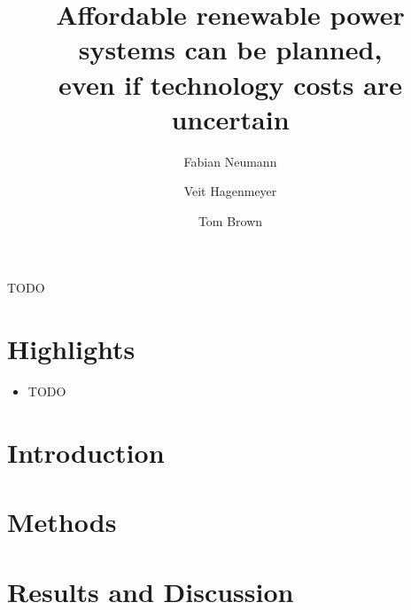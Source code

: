 \documentclass[1p,11pt]{elsarticle}
\begin{document}
\begin{frontmatter}

	\title{Affordable renewable power systems can be planned,\\
	       even if technology costs are uncertain}
	
	\author[kitaddress]{Fabian Neumann}
	\author[kitaddress]{Veit Hagenmeyer}
	\author[kitaddress]{Tom Brown}
	\address[kitaddress]{Institute for Automation and Applied Informatics (IAI), Karlsruhe Institute of Technology (KIT), Hermann-von-Helmholtz-Platz 1, 76344, Eggenstein-Leopoldshafen, Germany}

	\begin{abstract}
		
	\end{abstract}

	\begin{keyword}
		TODO
	\end{keyword}

\end{frontmatter}

\begin{small}
	\tableofcontents
\end{small}

\section*{Highlights}

\begin{itemize}
	\item TODO
\end{itemize}

\section{Introduction}
\label{sec:intro}



\section{Methods}
\label{sec:methods}



\section{Results and Discussion}
\label{sec:results}
\end{document}
